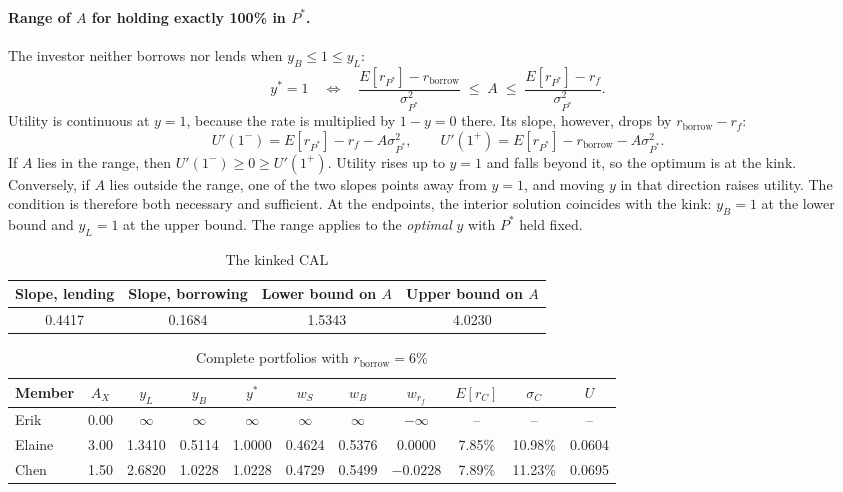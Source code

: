 \documentclass[11pt]{article}
\newcommand{\rb}{r_{\text{borrow}}}
\newcommand{\Er}[1]{E[r_{#1}]}
\begin{document}
\paragraph{Range of $A$ for holding exactly 100\% in $P^*$.}
The investor neither borrows nor lends when $y_B \le 1 \le y_L$:
\[
y^* = 1 \quad\Longleftrightarrow\quad
\frac{\Er{P^*} - \rb}{\sigma_{P^*}^2} \;\le\; A \;\le\; \frac{\Er{P^*} - r_f}{\sigma_{P^*}^2}.
\]
Utility is continuous at $y = 1$, because the rate is multiplied by $1 - y = 0$ there. Its slope, however, drops by $\rb - r_f$:
\[
U'(1^-) = \Er{P^*} - r_f - A\sigma_{P^*}^2, \qquad
U'(1^+) = \Er{P^*} - \rb - A\sigma_{P^*}^2.
\]
If $A$ lies in the range, then $U'(1^-) \ge 0 \ge U'(1^+)$. Utility rises up to $y = 1$ and falls beyond it, so the optimum is at the kink. Conversely, if $A$ lies outside the range, one of the two slopes points away from $y = 1$, and moving $y$ in that direction raises utility. The condition is therefore both necessary and sufficient. At the endpoints, the interior solution coincides with the kink: $y_B = 1$ at the lower bound and $y_L = 1$ at the upper bound. The range applies to the \emph{optimal} $y$ with $P^*$ held fixed.

\begin{table}[H]
\centering
\caption{The kinked CAL}\label{tab:kink}
\begin{tabular}{cccc}
\toprule
Slope, lending & Slope, borrowing & Lower bound on $A$ & Upper bound on $A$ \\
\midrule
0.4417 & 0.1684 & 1.5343 & 4.0230 \\
\bottomrule
\end{tabular}
\end{table}

\begin{table}[H]
\centering
\caption{Complete portfolios with $\rb = 6\%$}
\small
\setlength{\tabcolsep}{4pt}
\begin{tabular}{lcccccccccc}
\toprule
Member & $A_X$ & $y_L$ & $y_B$ & $y^*$ & $w_S$ & $w_B$ & $w_{r_f}$ & $\Er{C}$ & $\sigma_C$ & $U$ \\
\midrule
Erik   & 0.00 & $\infty$ & $\infty$ & $\infty$ & $\infty$ & $\infty$ & $-\infty$ & -- & -- & -- \\
Elaine & 3.00 & 1.3410 & 0.5114 & 1.0000 & 0.4624 & 0.5376 & 0.0000    & 7.85\% & 10.98\% & 0.0604 \\
Chen   & 1.50 & 2.6820 & 1.0228 & 1.0228 & 0.4729 & 0.5499 & $-0.0228$ & 7.89\% & 11.23\% & 0.0695 \\
\bottomrule
\end{tabular}
\end{table}
\end{document}
